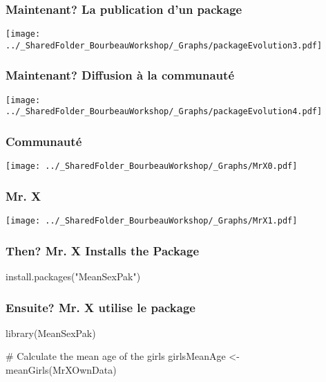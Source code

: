 \documentclass{beamer}
\begin{document}
    \begin{frame}
        \frametitle{Maintenant? La publication d'un package} \vspace{1cm}
        \begin{center}
            \texttt{[image: ../\_SharedFolder\_BourbeauWorkshop/\_Graphs/packageEvolution3.pdf]}
        \end{center}
    \end{frame} 
    
    \begin{frame}
        \frametitle{Maintenant? Diffusion à la communauté} \vspace{1cm}
        \begin{center}
            \texttt{[image: ../\_SharedFolder\_BourbeauWorkshop/\_Graphs/packageEvolution4.pdf]}
        \end{center}
    \end{frame} 
    
    \begin{frame}
        \frametitle{Communauté \R} \vspace{1cm}
        \begin{center}
            \texttt{[image: ../\_SharedFolder\_BourbeauWorkshop/\_Graphs/MrX0.pdf]}
        \end{center}
    \end{frame}
    
    \begin{frame}
        \frametitle{Mr. X} \vspace{1cm}
        \begin{center}
            \texttt{[image: ../\_SharedFolder\_BourbeauWorkshop/\_Graphs/MrX1.pdf]}
        \end{center}
    \end{frame}

    \begin{frame}[fragile=singleslide]
        \frametitle{Then? Mr. X Installs the Package}
        \begin{code}
install.packages("MeanSexPak")
        \end{code}
    \end{frame}
    
    \begin{frame}[fragile=singleslide]
        \frametitle{Ensuite? Mr. X utilise le package}
        \begin{code}
library(MeanSexPak)

# Calculate the mean age of the girls
girlsMeanAge <- meanGirls(MrXOwnData)
        \end{code}
    \end{frame}
    
\end{document}
